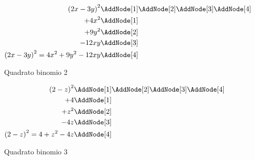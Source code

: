 \begin{figure}
\begin{NodesList}
	\begin{align*}
		\left(2x-3y\right)^2&\AddNode[1]\AddNode[2]\AddNode[3]\AddNode[4]\\
		+4x^2&\AddNode[1]&\\ 
		+9y^2&\AddNode[2]&\\
		-12xy&\AddNode[3]\\
		\left(2x-3y\right)^2=4x^2+9y^2-12xy&\AddNode[4]
	\end{align*}
\end{NodesList}
	\caption[]{Quadrato binomio 2}
	\label{fig:polinomiquadratobinomio2}
\end{figure}
\begin{figure}
\begin{NodesList}
	\begin{align*}
		\left(2-z\right)^2&\AddNode[1]\AddNode[2]\AddNode[3]\AddNode[4]\\
		+4&\AddNode[1]&\\ 
		+z^2&\AddNode[2]&\\
		-4z&\AddNode[3]\\
		\left(2-z\right)^2=4+z^2-4z&\AddNode[4]
	\end{align*}
\end{NodesList}
	\caption[]{Quadrato binomio 3}
	\label{fig:polinomiquadratobinomio3}
\end{figure}
